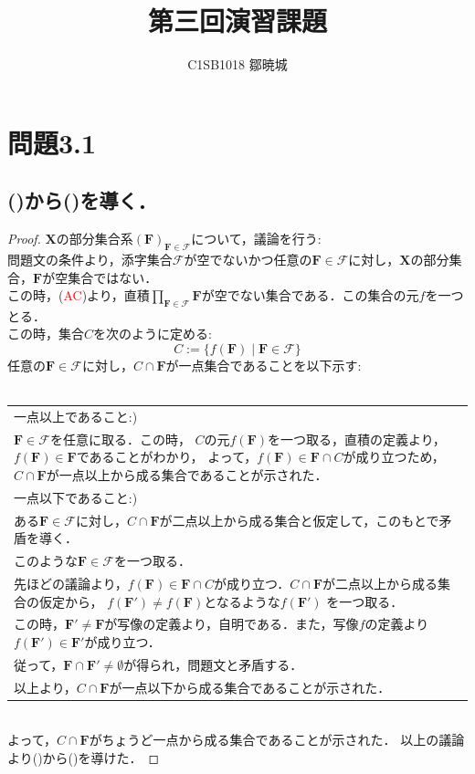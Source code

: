 \documentclass{jarticle}
\begin{document}
\title{第三回演習課題}
\author{C1SB1018 鄒暁城}
\maketitle

\section{問題3.1}
\subsection{()から()を導く．}
\begin{proof}
$\mathbf{X}$の部分集合系$(\mathbf{F})_{\mathbf{F} \in \mathcal{F}}$について，議論を行う:\\
問題文の条件より，添字集合$\mathcal{F}$が空でないかつ任意の$\mathbf{F} \in \mathcal{F}$に対し，$\mathbf{X}$の部分集合，$\mathbf{F}$が空集合ではない．\\
この時，(\textcolor{red}{AC})より，直積$\prod\limits_{\mathbf{F} \in \mathcal{F}} \mathbf{F}$が空でない集合である．この集合の元$f$を一つとる．\\
この時，集合$C$を次のように定める:\\
$$
C:= \{f(\mathbf{F}) \mid  \mathbf{F} \in \mathcal{F} \}
$$
任意の$\mathbf{F} \in \mathcal{F}$に対し，$C \cap \mathbf{F} $が一点集合であることを以下示す:\\
\\
	\begin{tabular}{|p{11cm}|}
		\hline
一点以上であること:)\\
$\mathbf{F} \in \mathcal{F}$を任意に取る．この時，
	$C$の元$f(\mathbf{F})$を一つ取る，直積の定義より，$f(\mathbf{F}) \in \mathbf{F}$であることがわかり，
	よって，$f(\mathbf{F}) \in \mathbf{F} \cap C$が成り立つため，$ C \cap \mathbf{F}$が一点以上から成る集合であることが示された．\\
	\hline
一点以下であること:)\\
ある$\mathbf{F} \in \mathcal{F}$に対し，$ C \cap \mathbf{F}$が二点以上から成る集合と仮定して，このもとで矛盾を導く．\\
このような$\mathbf{F} \in \mathcal{F}$を一つ取る．\\
	先ほどの議論より，$f(\mathbf{F}) \in \mathbf{F} \cap C$が成り立つ．$ C \cap \mathbf{F}$が二点以上から成る集合の仮定から，
	$f(\mathbf{F}') \neq f(\mathbf{F})$となるような$f(\mathbf{F}')$ を一つ取る．\\
	この時，$\mathbf{F}' \neq \mathbf{F}$が写像の定義より，自明である．また，写像$f$の定義より
	$f(\mathbf{F}') \in \mathbf{F}'$が成り立つ．\\
	従って，$\mathbf{F} \cap \mathbf{F}' \neq \emptyset$が得られ，問題文と矛盾する．\\
	以上より，$ C \cap \mathbf{F}$が一点以下から成る集合であることが示された．\\
	\hline
	\end{tabular}
\noindent \\
よって，$ C \cap \mathbf{F}$がちょうど一点から成る集合であることが示された．
以上の議論より()から()を導けた．
\end{proof}
\end{document}
